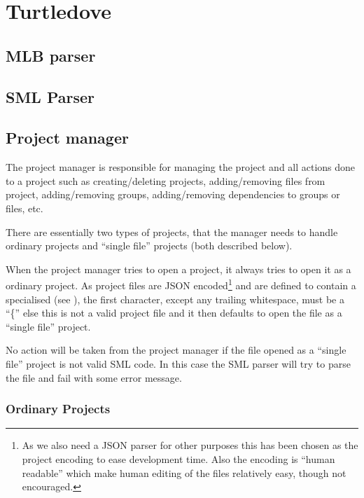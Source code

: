

\section{Turtledove}
\label{sec:design-turtledove}


\subsection{MLB parser}
\label{sec:design-mlb-parser}

\subsection{SML Parser}
\label{sec:design-sml-parser}


\subsection{Project manager}
\label{sec:design-project-manager}

The project manager is responsible for managing the project and all actions done
to a project such as creating/deleting projects, adding/removing files from
project, adding/removing groups, adding/removing dependencies to groups or
files, etc.


There are essentially two types of projects, that the manager needs to handle
ordinary projects and ``single file'' projects (both described below). 

When the project manager tries to open a project, it always tries to open it as
a ordinary project. As project files are JSON encoded\footnote{As we also need a
  JSON parser for other purposes this has been chosen as the project encoding to
  ease development time. Also the encoding is ``human readable'' which make
  human editing of the files relatively easy, though not encouraged.} and are
defined to contain a specialised  (see
), the first character, except any trailing whitespace,
must be a ``\{'' else this is not a valid project file and it then defaults to
open the file as a ``single file'' project.

No action will be taken from the project manager if the file opened as a
``single file'' project is not valid SML code. In this case the SML parser will
try to parse the file and fail with some error message.

\subsubsection{Ordinary Projects}


